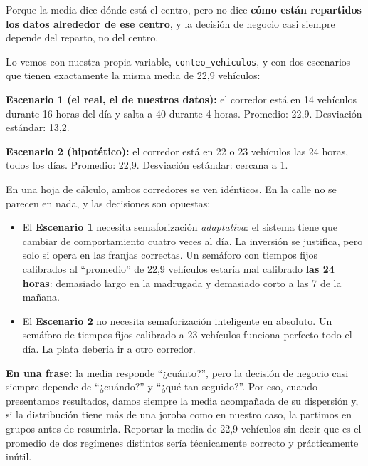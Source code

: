 \documentclass[11pt]{article}
\begin{document}
\begin{respuesta}[Respuesta 1.5]
Porque la media dice dónde está el centro, pero no dice \textbf{cómo están repartidos los datos alrededor de ese centro}, y la decisión de negocio casi siempre depende del reparto, no del centro.

Lo vemos con nuestra propia variable, \texttt{conteo\_vehiculos}, y con dos escenarios que tienen exactamente la misma media de 22,9 vehículos:

\medskip
\noindent\textbf{Escenario 1 (el real, el de nuestros datos):} el corredor está en 14 vehículos durante 16 horas del día y salta a 40 durante 4 horas. Promedio: 22,9. Desviación estándar: 13,2.

\noindent\textbf{Escenario 2 (hipotético):} el corredor está en 22 o 23 vehículos las 24 horas, todos los días. Promedio: 22,9. Desviación estándar: cercana a 1.

\medskip
En una hoja de cálculo, ambos corredores se ven idénticos. En la calle no se parecen en nada, y las decisiones son opuestas:

\begin{itemize}[leftmargin=1.3em]
  \item El \textbf{Escenario 1} necesita semaforización \emph{adaptativa}: el sistema tiene que cambiar de comportamiento cuatro veces al día. La inversión se justifica, pero solo si opera en las franjas correctas. Un semáforo con tiempos fijos calibrados al ``promedio'' de 22,9 vehículos estaría mal calibrado \textbf{las 24 horas}: demasiado largo en la madrugada y demasiado corto a las 7 de la mañana.
  \item El \textbf{Escenario 2} no necesita semaforización inteligente en absoluto. Un semáforo de tiempos fijos calibrado a 23 vehículos funciona perfecto todo el día. La plata debería ir a otro corredor.
\end{itemize}

\medskip
\noindent\textbf{En una frase:} la media responde ``¿cuánto?'', pero la decisión de negocio casi siempre depende de ``¿cuándo?'' y ``¿qué tan seguido?''. Por eso, cuando presentamos resultados, damos siempre la media acompañada de su dispersión y, si la distribución tiene más de una joroba como en nuestro caso, la partimos en grupos antes de resumirla. Reportar la media de 22,9 vehículos sin decir que es el promedio de dos regímenes distintos sería técnicamente correcto y prácticamente inútil.
\end{respuesta}


\end{document}
